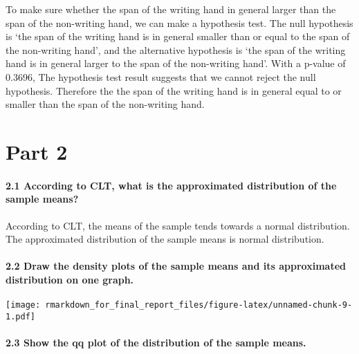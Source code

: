 \documentclass[]{article}
\let\oldparagraph\paragraph
\renewcommand{\paragraph}[1]{\oldparagraph{#1}\mbox{}}
\begin{document}
To make sure whether the span of the writing hand in general larger than
the span of the non-writing hand, we can make a hypothesis test. The
null hypothesis is `the span of the writing hand is in general smaller
than or equal to the span of the non-writing hand', and the alternative
hypothesis is `the span of the writing hand is in general larger to the
span of the non-writing hand'. With a p-value of 0.3696, The hypothesis
test result suggests that we cannot reject the null hypothesis.
Therefore the the span of the writing hand is in general equal to or
smaller than the span of the non-writing hand.

\hypertarget{part-2}{%
\section{Part 2}\label{part-2}}

\hypertarget{according-to-clt-what-is-the-approximated-distribution-of-the-sample-means}{%
\paragraph{\texorpdfstring{\textbf{2.1 According to CLT, what is the
approximated distribution of the sample means?
}}{2.1 According to CLT, what is the approximated distribution of the sample means? }}\label{according-to-clt-what-is-the-approximated-distribution-of-the-sample-means}}

According to CLT, the means of the sample tends towards a normal
distribution. The approximated distribution of the sample means is
normal distribution.

\hypertarget{draw-the-density-plots-of-the-sample-means-and-its-approximated-distribution-on-one-graph.}{%
\paragraph{\texorpdfstring{\textbf{2.2 Draw the density plots of the
sample means and its approximated distribution on one
graph.}}{2.2 Draw the density plots of the sample means and its approximated distribution on one graph.}}\label{draw-the-density-plots-of-the-sample-means-and-its-approximated-distribution-on-one-graph.}}

\texttt{[image: rmarkdown\_for\_final\_report\_files/figure-latex/unnamed-chunk-9-1.pdf]}

\hypertarget{show-the-qq-plot-of-the-distribution-of-the-sample-means.}{%
\paragraph{\texorpdfstring{\textbf{2.3 Show the qq plot of the
distribution of the sample means.
}}{2.3 Show the qq plot of the distribution of the sample means. }}\label{show-the-qq-plot-of-the-distribution-of-the-sample-means.}}
\end{document}
